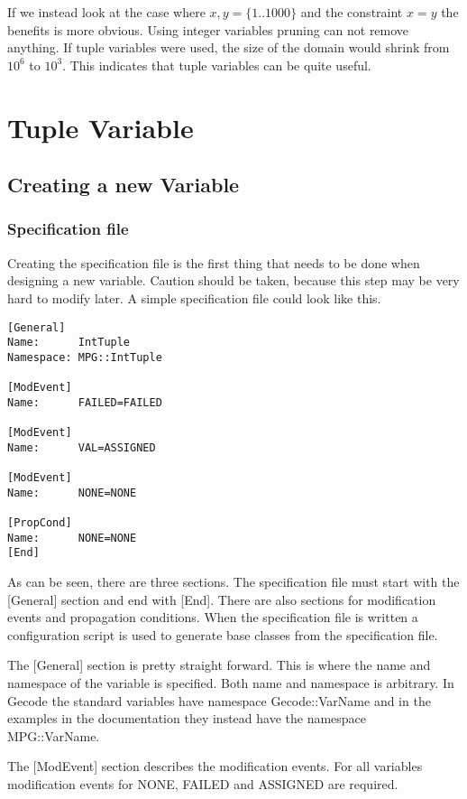 \documentclass[a4paper,11pt]{article}
\begin{document}
If we instead look at the case where $x,y=\{1..1000\}$ and the constraint $x=y$ the benefits is more obvious. Using integer variables pruning can not remove anything. If tuple variables were used, the size of the domain would shrink from $10^6$ to $10^3$. This indicates that tuple variables can be quite useful.

\section{Tuple Variable}

\subsection{Creating a new Variable}
\subsubsection{Specification file}
Creating the specification file is the first thing that needs to be done when designing a new variable. Caution should be taken, because this step may be very hard to modify later. A simple specification file could look like this.

\begin{lstlisting}[frame=single]
[General]
Name:      IntTuple
Namespace: MPG::IntTuple

[ModEvent]
Name:      FAILED=FAILED

[ModEvent]
Name:      VAL=ASSIGNED

[ModEvent]
Name:      NONE=NONE

[PropCond]
Name:      NONE=NONE
[End]
\end{lstlisting}

As can be seen, there are three sections. The specification file must start with the [General] section and end with [End]. There are also sections for modification events and propagation conditions. When the specification file is written a configuration script is used to generate base classes from the specification file.

The [General] section is pretty straight forward. This is where the name and namespace of the variable is specified. Both name and namespace is arbitrary. In Gecode the standard variables have namespace Gecode::VarName and in the examples in the documentation they instead have the namespace MPG::VarName.

The [ModEvent] section describes the modification events. For all variables modification events for NONE, FAILED and ASSIGNED are required.
\end{document}
